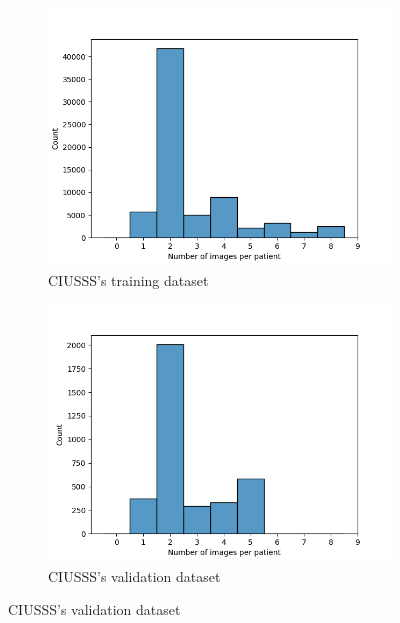 \documentclass[11pt]{article}
\begin{document}
    \newpage
\begin{figure}[H]
     \centering
     \begin{subfigure}[b]{0.45\linewidth}
         \centering
         \includegraphics[width=\linewidth]{plots/image_count_ciusss_train}
         \caption{CIUSSS's training dataset}
         \vspace{4ex}
         \label{fig:count_image_ciusss_train}
     \end{subfigure}
     \hfill
     \begin{subfigure}[b]{0.45\linewidth}
         \centering
         \includegraphics[width=\linewidth]{plots/image_count_ciusss_valid}
         \caption{CIUSSS's validation dataset}
         \vspace{4ex}
         \label{fig:count_image_ciusss_valid}
     \end{subfigure}



\end{figure}
\end{document}
